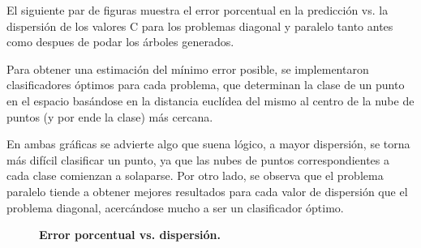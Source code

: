\documentclass[a4paper, 11pt]{article} %
\begin{document}
El siguiente par de figuras muestra el error porcentual en la predicción vs. la
dispersión de los valores C para los problemas diagonal y paralelo tanto antes
como despues de podar los árboles generados.

Para obtener una estimación del mínimo error posible, se implementaron
clasificadores óptimos para cada problema, que determinan la clase de un punto
en el espacio basándose  en la distancia euclídea del mismo al centro de la
nube de puntos (y por ende la clase) más cercana.

En ambas gráficas se advierte algo que suena lógico, a mayor dispersión, se
torna más difícil clasificar un punto, ya que las nubes de puntos
correspondientes a cada clase comienzan a solaparse. Por otro lado, se observa
que el problema paralelo tiende a obtener mejores resultados para cada valor de
dispersión que el problema diagonal, acercándose mucho a ser un clasificador
óptimo. 

\begin{figure}[H]
\captionsetup[subfigure]{labelformat=empty}
  \centering
  \caption*{\textbf{Error porcentual vs. dispersión.}}
\end{figure}
\end{document}
